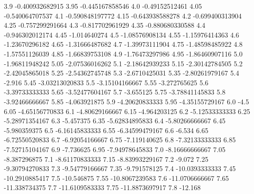             3.9  -0.400932682915
           3.95  -0.445167858546
            4.0   -0.49152512461
           4.05  -0.540064707537
            4.1  -0.590848197772
           4.15  -0.643938588278
            4.2  -0.699400313904
           4.25  -0.757299291664
            4.3  -0.817702961929
           4.35  -0.880680330588
            4.4  -0.946302012174
           4.45     -1.014640274
            4.5   -1.08576908134
           4.55   -1.15976414363
            4.6   -1.23670296182
           4.65   -1.31666487682
            4.7   -1.39973111904
           4.75   -1.48598485922
            4.8   -1.57551126039
           4.85   -1.66839753108
            4.9   -1.76473297986
           4.95   -1.86460907116
            5.0   -1.96811948242
           5.05   -2.07536016262
            5.1   -2.18642939233
           5.15   -2.30142784505
            5.2   -2.42045865018
           5.25   -2.54362745748
            5.3    -2.6710425031
           5.35   -2.80261979167
            5.4           -2.916
           5.45   -3.03213020833
            5.5   -3.15104166667
           5.55     -3.272765625
            5.6   -3.39733333333
           5.65   -3.52477604167
            5.7        -3.655125
           5.75   -3.78841145833
            5.8   -3.92466666667
           5.85     -4.063921875
            5.9   -4.20620833333
           5.95   -4.35155729167
            6.0             -4.5
           6.05   -4.65156770833
            6.1   -4.80629166667
           6.15     -4.964203125
            6.2   -5.12533333333
           6.25   -5.28971354167
            6.3        -5.457375
           6.35   -5.62834895833
            6.4   -5.80266666667
           6.45     -5.980359375
            6.5   -6.16145833333
           6.55   -6.34599479167
            6.6           -6.534
           6.65   -6.72550520833
            6.7   -6.92054166667
           6.75     -7.119140625
            6.8   -7.32133333333
           6.85   -7.52715104167
            6.9        -7.736625
           6.95   -7.94978645833
            7.0   -8.16666666667
           7.05     -8.387296875
            7.1   -8.61170833333
           7.15   -8.83993229167
            7.2           -9.072
           7.25   -9.30794270833
            7.3   -9.54779166667
           7.35     -9.791578125
            7.4   -10.0393333333
           7.45   -10.2910885417
            7.5       -10.546875
           7.55   -10.8067239583
            7.6   -11.0706666667
           7.65    -11.338734375
            7.7   -11.6109583333
           7.75   -11.8873697917
            7.8          -12.168
